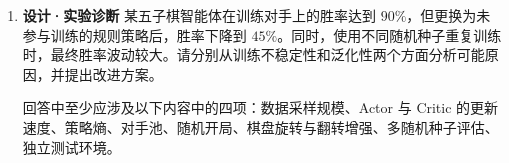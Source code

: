 \begin{exercisebox}
\begin{enumerate}
    \item \textbf{设计·实验诊断} 某五子棋智能体在训练对手上的胜率达到 $90\%$，但更换为未参与训练的规则策略后，胜率下降到 $45\%$。同时，使用不同随机种子重复训练时，最终胜率波动较大。请分别从训练不稳定性和泛化性两个方面分析可能原因，并提出改进方案。

    回答中至少应涉及以下内容中的四项：数据采样规模、Actor 与 Critic 的更新速度、策略熵、对手池、随机开局、棋盘旋转与翻转增强、多随机种子评估、独立测试环境。
  \end{enumerate}
\end{exercisebox}
